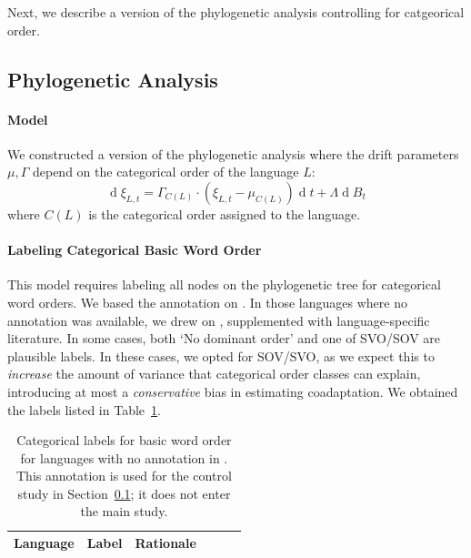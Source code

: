 \documentclass[11pt,a4paper]{article}
\begin{document}
Next, we describe a version of the phylogenetic analysis controlling for catgeorical order.

\subsection{Phylogenetic Analysis}\label{sec:categorical}


\paragraph{Model}

We constructed a version of the phylogenetic analysis where the drift parameters $\mu, \Gamma$ depend on the categorical order of the language $L$:
\begin{equation*}
    \operatorname{d}\xi_{L,t} = \Gamma_{C(L)} \cdot (\xi_{L,t}-\mu_{C(L)}) \operatorname{d}t + \Lambda \operatorname{d}B_t
\end{equation*}
where $C(L)$ is the categorical order assigned to the language.

\paragraph{Labeling Categorical Basic Word Order}
This model requires labeling all nodes on the phylogenetic tree for categorical word orders.
We based the annotation on \citet{wals-81}.
In those languages where no annotation was available, we drew on \citep{gell-mann-origin-2011}, supplemented with language-specific literature.
In some cases, both `No dominant order' and one of SVO/SOV are plausible labels. In these cases, we opted for SOV/SVO, as we expect this to \emph{increase} the amount of variance that categorical order classes can explain, introducing at most a \emph{conservative} bias in estimating coadaptation.
We obtained the labels listed in Table~\ref{tab:categorical}.

\begin{table}
\begin{tabular}{llp{}lll}
\hline
	Language & Label & Rationale \\ \hline

\hline
\end{tabular}
	\caption{Categorical labels for basic word order for languages with no annotation in \citet{wals-81}. This annotation is used for the control study in Section~\ref{sec:categorical}; it does not enter the main study.}\label{tab:categorical}
\end{table}
%
%
\end{document}
